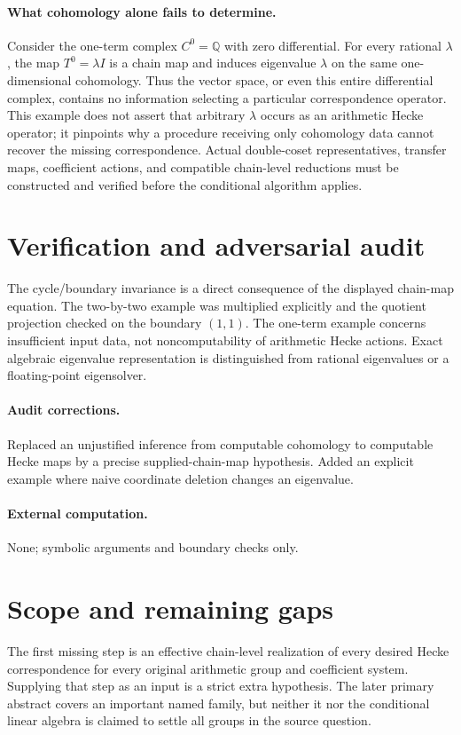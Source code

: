 \documentclass[11pt]{article}
\begin{document}
\paragraph{What cohomology alone fails to determine.}
Consider the one-term complex $C^0=\mathbb Q$ with zero differential. For every rational $\lambda$, the map $T^0=\lambda I$ is a chain map and induces eigenvalue $\lambda$ on the same one-dimensional cohomology. Thus the vector space, or even this entire differential complex, contains no information selecting a particular correspondence operator. This example does not assert that arbitrary $\lambda$ occurs as an arithmetic Hecke operator; it pinpoints why a procedure receiving only cohomology data cannot recover the missing correspondence. Actual double-coset representatives, transfer maps, coefficient actions, and compatible chain-level reductions must be constructed and verified before the conditional algorithm applies.
\section{Verification and adversarial audit}
The cycle/boundary invariance is a direct consequence of the displayed chain-map equation. The two-by-two example was multiplied explicitly and the quotient projection checked on the boundary $(1,1)$. The one-term example concerns insufficient input data, not noncomputability of arithmetic Hecke actions. Exact algebraic eigenvalue representation is distinguished from rational eigenvalues or a floating-point eigensolver.
\paragraph{Audit corrections.} Replaced an unjustified inference from computable cohomology to computable Hecke maps by a precise supplied-chain-map hypothesis. Added an explicit example where naive coordinate deletion changes an eigenvalue.
\paragraph{External computation.} None; symbolic arguments and boundary checks only.
\section{Scope and remaining gaps}
The first missing step is an effective chain-level realization of every desired Hecke correspondence for every original arithmetic group and coefficient system. Supplying that step as an input is a strict extra hypothesis. The later primary abstract covers an important named family, but neither it nor the conditional linear algebra is claimed to settle all groups in the source question.
\end{document}
